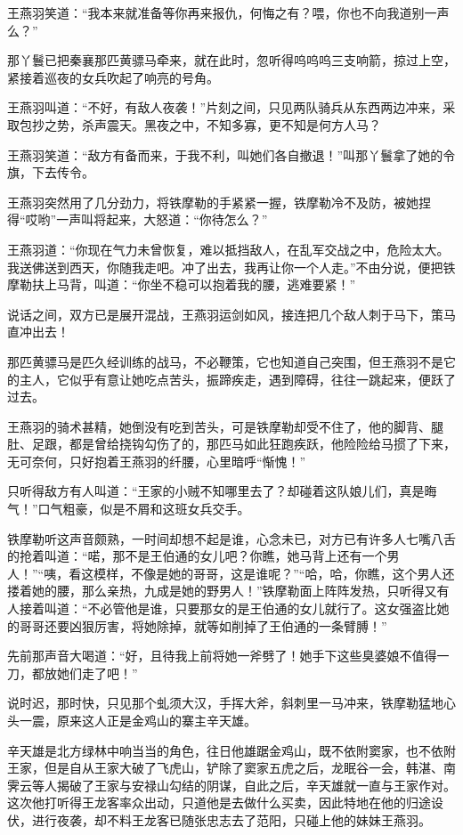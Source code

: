 \documentclass[12pt,oneside]{book}
\begin{document}
王燕羽笑道：``我本来就准备等你再来报仇，何悔之有？喂，你也不向我道别一声么？''

那丫鬟已把秦襄那匹黄骠马牵来，就在此时，忽听得呜呜呜三支响箭，掠过上空，紧接着巡夜的女兵吹起了响亮的号角。

王燕羽叫道：``不好，有敌人夜袭！''片刻之间，只见两队骑兵从东西两边冲来，采取包抄之势，杀声震天。黑夜之中，不知多寡，更不知是何方人马？

王燕羽笑道：``敌方有备而来，于我不利，叫她们各自撤退！''叫那丫鬟拿了她的令旗，下去传令。

王燕羽突然用了几分劲力，将铁摩勒的手紧紧一握，铁摩勒冷不及防，被她捏得``哎哟''一声叫将起来，大怒道：``你待怎么？''

王燕羽道：``你现在气力未曾恢复，难以抵挡敌人，在乱军交战之中，危险太大。我送佛送到西天，你随我走吧。冲了出去，我再让你一个人走。''不由分说，便把铁摩勒扶上马背，叫道：``你坐不稳可以抱着我的腰，逃难要紧！''

说话之间，双方已是展开混战，王燕羽运剑如风，接连把几个敌人刺于马下，策马直冲出去！

那匹黄骠马是匹久经训练的战马，不必鞭策，它也知道自己突围，但王燕羽不是它的主人，它似乎有意让她吃点苦头，振蹄疾走，遇到障碍，往往一跳起来，便跃了过去。

王燕羽的骑术甚精，她倒没有吃到苦头，可是铁摩勒却受不住了，他的脚背、腿肚、足跟，都是曾给挠钩勾伤了的，那匹马如此狂跑疾跃，他险险给马掼了下来，无可奈何，只好抱着王燕羽的纤腰，心里暗呼``惭愧！''

只听得敌方有人叫道：``王家的小贼不知哪里去了？却碰着这队娘儿们，真是晦气！''口气粗豪，似是不屑和这班女兵交手。

铁摩勒听这声音颇熟，一时间却想不起是谁，心念未已，对方已有许多人七嘴八舌的抢着叫道：``喏，那不是王伯通的女儿吧？你瞧，她马背上还有一个男人！''``咦，看这模样，不像是她的哥哥，这是谁呢？''``哈，哈，你瞧，这个男人还搂着她的腰，那么亲热，九成是她的野男人！''铁摩勒面上阵阵发热，只听得又有人接着叫道：``不必管他是谁，只要那女的是王伯通的女儿就行了。这女强盗比她的哥哥还要凶狠厉害，将她除掉，就等如削掉了王伯通的一条臂膊！''

先前那声音大喝道：``好，且待我上前将她一斧劈了！她手下这些臭婆娘不值得一刀，都放她们走了吧！''

说时迟，那时快，只见那个虬须大汉，手挥大斧，斜刺里一马冲来，铁摩勒猛地心头一震，原来这人正是金鸡山的寨主辛天雄。

辛天雄是北方绿林中响当当的角色，往日他雄踞金鸡山，既不依附窦家，也不依附王家，但是自从王家大破了飞虎山，铲除了窦家五虎之后，龙眠谷一会，韩湛、南霁云等人揭破了王家与安禄山勾结的阴谋，自此之后，辛天雄就一直与王家作对。这次他打听得王龙客率众出动，只道他是去做什么买卖，因此特地在他的归途设伏，进行夜袭，却不料王龙客已随张忠志去了范阳，只碰上他的妹妹王燕羽。
\end{document}
